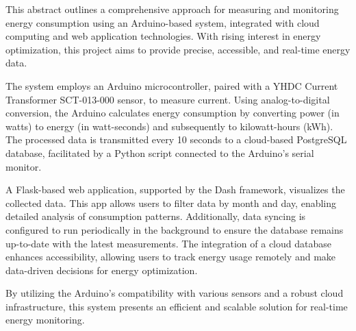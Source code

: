 
This abstract outlines a comprehensive approach for measuring and monitoring energy consumption using an Arduino-based system, integrated with cloud computing and web application technologies. With rising interest in energy optimization, this project aims to provide precise, accessible, and real-time energy data. 

The system employs an Arduino microcontroller, paired with a YHDC Current Transformer SCT-013-000 sensor, to measure current. Using analog-to-digital conversion, the Arduino calculates energy consumption by converting power (in watts) to energy (in watt-seconds) and subsequently to kilowatt-hours (kWh). The processed data is transmitted every 10 seconds to a cloud-based PostgreSQL database, facilitated by a Python script connected to the Arduino's serial monitor.

A Flask-based web application, supported by the Dash framework, visualizes the collected data. This app allows users to filter data by month and day, enabling detailed analysis of consumption patterns. Additionally, data syncing is configured to run periodically in the background to ensure the database remains up-to-date with the latest measurements. The integration of a cloud database enhances accessibility, allowing users to track energy usage remotely and make data-driven decisions for energy optimization.

By utilizing the Arduino's compatibility with various sensors and a robust cloud infrastructure, this system presents an efficient and scalable solution for real-time energy monitoring.